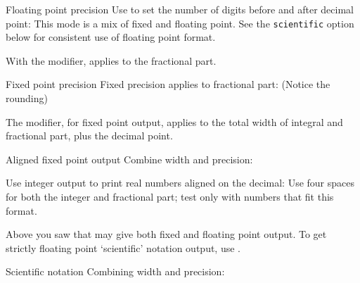 \begin{block}{Floating point precision}
  \label{sl:io-float}
  Use  to set the number of digits before and after
  decimal point:
  This mode is a mix of fixed and floating point.
  See the \lstinline{scientific} option below
  for consistent use of floating point format.
\end{block}

With the  modifier, 
applies to the fractional part.

\begin{block}{Fixed point precision}
  \label{sl:io-fix}
  Fixed precision applies to fractional part:
  (Notice the rounding)
\end{block}

The  modifier, for fixed point output,
applies to the total width of integral and fractional part,
plus the decimal point.

\begin{block}{Aligned fixed point output}
  \label{sl:io-align}
  Combine width and precision:
\end{block}

\begin{exercise}
  \label{ex:fixedpout}
  Use integer output to print real numbers aligned on the
  decimal:
  Use four spaces for both the integer and fractional part; test only
  with numbers that fit this format.
\end{exercise}

Above you saw that  may give both fixed and floating point
output. To get strictly floating point `scientific' notation output,
use .

\begin{block}{Scientific notation}
  \label{sl:io-sci}
  Combining width and precision:
  
\end{block}

\begin{comment}
\begin{verbatim}
cout << "Combine width and precision:" << "\n";
x = 1.234567;
cout << scientific;
for (int i=0; i<10; i++) {
  cout << setw(10) << setprecision(4) << x << "\n";
  x *= 10;
}
\end{verbatim}
\begin{block}{Output}
  \label{sl:io-sci-out}
\begin{verbatim}
Combine width and precision:
1.2346e+00
1.2346e+01
1.2346e+02
1.2346e+03
1.2346e+04
1.2346e+05
1.2346e+06
1.2346e+07
1.2346e+08
1.2346e+09
\end{verbatim}
\end{block}
\end{comment}


